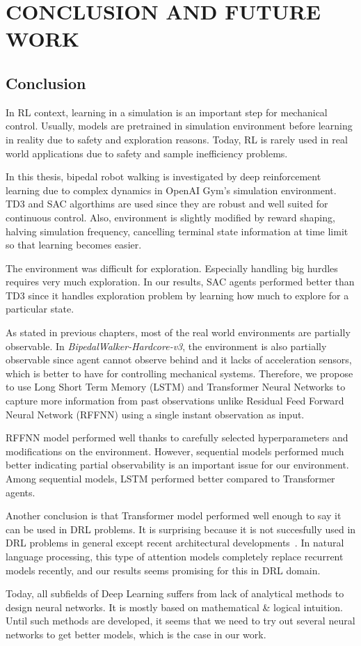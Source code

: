 \chapter{CONCLUSION AND FUTURE WORK}
\label{chap:conclusion_future_work}

\section{Conclusion}
\label{sec:conclusion}
In RL context, learning in a simulation is an important step for mechanical control. 
Usually, models are pretrained in simulation environment before learning in reality due to safety and exploration reasons. 
Today, RL is rarely used in real world applications due to safety and sample inefficiency problems. 

In this thesis, bipedal robot walking is investigated by deep  reinforcement learning due to complex dynamics in OpenAI Gym's simulation environment. 
TD3 and SAC algorthims are used since they are robust and well suited for continuous control. 
Also, environment is slightly modified by reward shaping, halving simulation frequency, cancelling terminal state information at time limit so that learning becomes easier.

The environment was difficult for exploration. 
Especially handling big hurdles requires very much exploration.
In our results, SAC agents performed better than TD3 since it handles exploration problem by learning how much to explore for a particular state. 
  
As stated in previous chapters, most of the real world environments are partially observable. 
In \textit{BipedalWalker-Hardcore-v3}, the environment is also partially observable since agent cannot observe behind and it lacks of acceleration sensors, which is better to have for controlling mechanical systems. 
Therefore, we propose to use Long Short Term Memory (LSTM) and Transformer Neural Networks to capture more information from past observations unlike Residual Feed Forward Neural Network (RFFNN) using a single instant observation as input. 

RFFNN model performed well thanks to carefully selected hyperparameters and modifications on the environment. 
However, sequential models performed much better indicating partial observability is an important issue for our environment. 
Among sequential models, LSTM performed better compared to Transformer agents. 

Another conclusion is that Transformer model performed well enough to say it can be used in DRL problems. 
It is surprising because it is not succesfully used in DRL problems in general except recent architectural developments~\cite{parisotto_stabilizing_2019}. 
In natural language processing, this type of attention models completely replace recurrent models recently, and our results seems promising for this in DRL domain. 

Today, all subfields of Deep Learning suffers from lack of analytical methods to design neural networks. 
It is mostly based on mathematical \& logical intuition. 
Until such methods are developed, it seems that we need to try out several neural networks to get better models, which is the case in our work. 